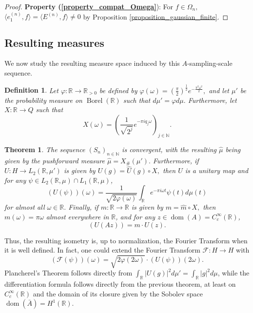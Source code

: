 \documentclass[10pt,a4paper]{amsart}
\newtheorem{theorem}{Theorem}[section]
\newtheorem{definition}[thm]{Definition}
\def \Dom{\operatorname{dom}}
\def \Borel{\operatorname{Borel}}
\def \HMU{\hat{\mu}}
\def \HU{\hat{U}}
\def \Hm{\hat{m}}
\def \LL{\langle}
\def \RR{\rangle}
\begin{document}
\begin{proof}
	
	\textbf{Property (\ref{property_compat_Omega}}): For $f\in\Omega_n,$ $\LL e_1^{(n)}, f\RR=\LL E^{(n)},f\RR\neq 0$ by Proposition \ref{proposition_gaussian_finite}.
\end{proof}

\subsection{Resulting measures}

We now study the resulting measure space induced by this $A$-sampling-scale sequence.
\begin{definition}
	Let $\varphi:\mathbb{R}\rightarrow\mathbb{R}_{>0}$ be defined by $\varphi(\omega)=\left(\frac{\pi}{2}\right)^{\frac{1}{2}}e^{-\frac{\pi^2\omega^2}{2}},$ and let $\mu'$ be the probability measure on $\Borel(\mathbb{R})$ such that $d\mu'=\varphi d\mu.$ Furthermore, let $X:\mathbb{R}\rightarrow Q$ such that $$X(\omega)=\left(\frac{1}{\sqrt{2^{j}}}e^{-\pi i q_j \omega}\right)_{j\in\mathbb{N}}.$$
\end{definition}
\begin{theorem}\label{theorem_differential_fourier_transform}
	The sequence $(S_n)_{n\in\mathbb{N}}$ is convergent, with the resulting $\HMU$ being given by the pushforward measure $\HMU=X_{\#}(\mu').$ Furthermore, if $U:H\rightarrow L_2(\mathbb{R},\mu')$ is given by $U(g)=\HU(g)\circ X,$ then $U$ is a unitary map and for any $\psi\in L_2(\mathbb{R},\mu)\cap L_1(\mathbb{R},\mu)$, $$(U(\psi))(\omega)=\frac{1}{\sqrt{2\varphi(\omega)}}\int_{\mathbb{R}}e^{-\pi i \omega t} \psi(t)d\mu(t)$$ for almost all $\omega\in \mathbb{R}.$ Finally, if $m:\mathbb{R}\rightarrow\mathbb{R}$ is given by $m=\Hm\circ X,$ then $m(\omega)=\pi \omega$ almost everywhere in $\mathbb{R}$, and for any $z\in \Dom(A)=C_c^{\infty}(\mathbb{R})$, $$(U(Az))=m\cdot U(z).$$
\end{theorem}

Thus, the resulting  isometry is, up to normalization, the Fourier Transform when it is well defined. In fact, one could extend the Fourier Transform $\mathcal{F}:H\rightarrow H$ with $$(\mathcal{F}(\psi))(\omega)=\sqrt{2\varphi(2\omega)}\cdot(U(\psi))(2\omega).$$
Plancherel's Theorem follows directly from $\int_{\mathbb{R}}|U(g)|^2d\mu'=\int_{\mathbb{R}}|g|^2d\mu$, while the differentiation formula follows directly from the previous theorem, at least on $C_c^{\infty}(\mathbb{R})$ and the domain of its closure given by the Sobolev space $\Dom(\bar{A})=H^1(\mathbb{R})$.
\end{document}
